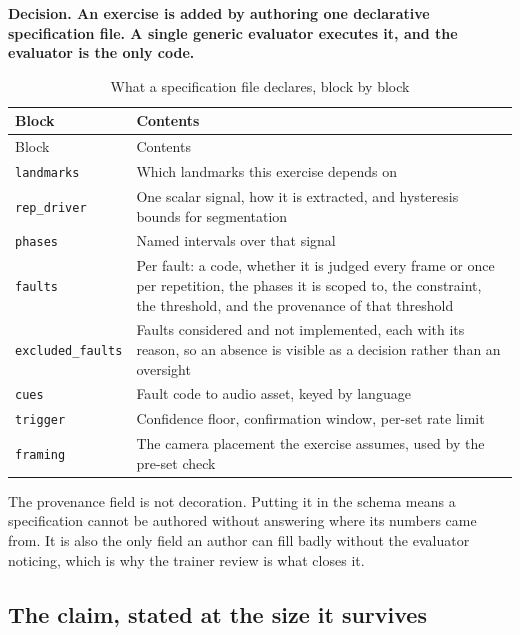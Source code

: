 \textbf{Decision. An exercise is added by authoring one declarative specification file. A single generic evaluator executes it, and the evaluator is the only code.}

{\small
\setlength{\LTpre}{6pt}\setlength{\LTpost}{8pt}
\begin{longtable}{>{\raggedright\arraybackslash}p{}>{\raggedright\arraybackslash}p{}}
\caption{What a specification file declares, block by block}\\
\toprule
Block & Contents \\
\midrule
\endfirsthead
\toprule
Block & Contents \\
\midrule
\endhead
\bottomrule
\endfoot
\bottomrule
\endlastfoot
\texttt{landmarks} & Which landmarks this exercise depends on \\
\texttt{rep\_\allowbreak{}driver} & One scalar signal, how it is extracted, and hysteresis bounds for segmentation \\
\texttt{phases} & Named intervals over that signal \\
\texttt{faults} & Per fault: a code, whether it is judged every frame or once per repetition, the phases it is scoped to, the constraint, the threshold, and the provenance of that threshold \\
\texttt{excluded\_\allowbreak{}faults} & Faults considered and not implemented, each with its reason, so an absence is visible as a decision rather than an oversight \\
\texttt{cues} & Fault code to audio asset, keyed by language \\
\texttt{trigger} & Confidence floor, confirmation window, per-set rate limit \\
\texttt{framing} & The camera placement the exercise assumes, used by the pre-set check \\
\end{longtable}
}

The provenance field is not decoration. Putting it in the schema means a specification cannot be authored without answering where its numbers came from. It is also the only field an author can fill badly without the evaluator noticing, which is why the trainer review is what closes it.

\subsection{The claim, stated at the size it survives}
\label{sec:4.6.1}

